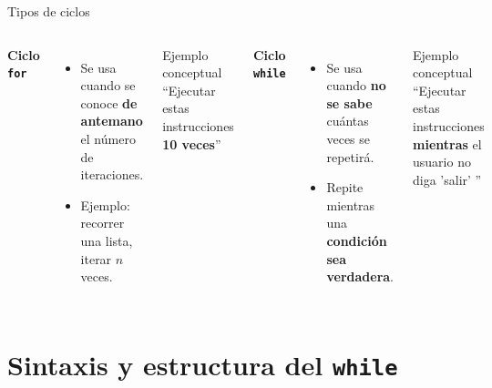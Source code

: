 \documentclass[aspectratio=169,xcolor=dvipsnames]{beamer}
\begin{document}
\begin{frame}{Tipos de ciclos}
    \begin{columns}
        \textbf{Ciclo \texttt{for}}
        \begin{itemize}
            \item Se usa cuando se conoce \textbf{de antemano} el n\'umero de iteraciones.
            \item Ejemplo: recorrer una lista, iterar $n$ veces.
        \end{itemize}
        \vspace{0.3cm}
        \begin{exampleblock}{Ejemplo conceptual}
            ``Ejecutar estas instrucciones \textbf{10 veces}''
        \end{exampleblock}

        \textbf{Ciclo \texttt{while}}
        \begin{itemize}
            \item Se usa cuando \textbf{no se sabe} cu\'antas veces se repetir\'a.
            \item Repite mientras una \textbf{condici\'on sea verdadera}.
        \end{itemize}
        \vspace{0.3cm}
        \begin{exampleblock}{Ejemplo conceptual}
            ``Ejecutar estas instrucciones \textbf{mientras} el usuario no diga 'salir' ''
        \end{exampleblock}
    \end{columns}
\end{frame}

\section{Sintaxis y estructura del \texttt{while}}
\end{document}
